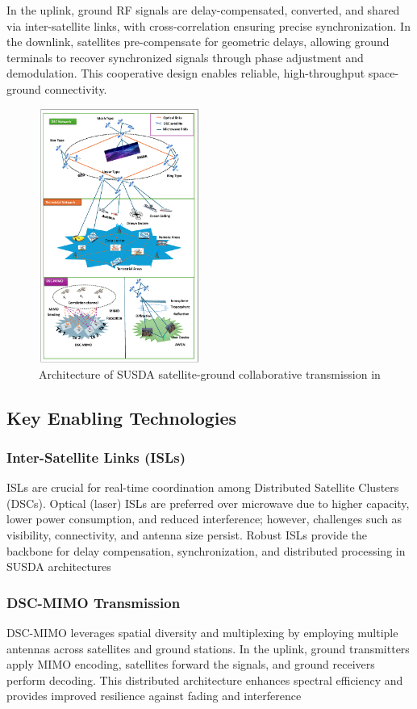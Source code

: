 \documentclass[conference]{IEEEtran}
\begin{document}
In the uplink, ground RF signals are delay-compensated, converted, and shared via inter-satellite links, with cross-correlation ensuring precise synchronization. In the downlink, satellites pre-compensate for geometric delays, allowing ground terminals to recover synchronized signals through phase adjustment and demodulation. This cooperative design enables reliable, high-throughput space-ground connectivity.
\begin{figure}
  \centering
  \includegraphics[width=0.47\textwidth]{System_model_2.png}
  \caption{Architecture of SUSDA satellite-ground collaborative transmission in \cite{YHe:24}}
  \label{fig2}
\end{figure}

\subsection{Key Enabling Technologies} \label{sec4.2}
\subsubsection{Inter-Satellite Links (ISLs)} \label{sec4.2.1}
ISLs are crucial for real-time coordination among Distributed Satellite Clusters (DSCs). Optical (laser) ISLs are preferred over microwave due to higher capacity, lower power consumption, and reduced interference; however, challenges such as visibility, connectivity, and antenna size persist. Robust ISLs provide the backbone for delay compensation, synchronization, and distributed processing in SUSDA architectures
\subsubsection{DSC-MIMO Transmission} \label{sec4.2.2}
DSC-MIMO leverages spatial diversity and multiplexing by employing multiple antennas across satellites and ground stations. In the uplink, ground transmitters apply MIMO encoding, satellites forward the signals, and ground receivers perform decoding. This distributed architecture enhances spectral efficiency and provides improved resilience against fading and interference
\end{document}
